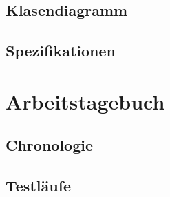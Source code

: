 \documentclass{article}
\begin{document}
\subsection{Klasendiagramm}
\subsection{Spezifikationen}


\newpage
\section{Arbeitstagebuch}\label{section-diary}

\subsection{Chronologie}
\subsection{Testläufe}


\end{document}
